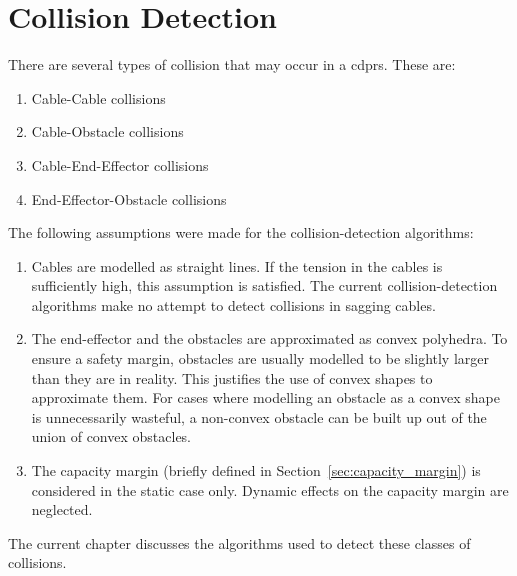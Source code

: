 \chapter{Collision Detection}%
\label{chap:collision_detection}


	There are several types of collision that may occur in a \glspl{cdpr}. These
	are:

	\begin{enumerate}

		\item Cable-Cable collisions

		\item Cable-Obstacle collisions

		\item Cable-End-Effector collisions

		\item End-Effector-Obstacle collisions

	\end{enumerate}

	The following assumptions were made for the collision-detection
	algorithms:

	\begin{enumerate}

		\item

			Cables are modelled as straight lines. If the tension in the cables
			is sufficiently high, this assumption is satisfied. The current
			collision-detection algorithms make no attempt to detect collisions
			in sagging cables.

		\item

			The end-effector and the obstacles are approximated as convex
			polyhedra. To ensure a safety margin, obstacles are usually modelled
			to be slightly larger than they are in reality. This justifies the
			use of convex  shapes to approximate them. For cases where modelling
			an obstacle as a convex shape is unnecessarily wasteful, a
			non-convex obstacle can be built up out of the union of convex
			obstacles.

		\item

			The capacity
			margin (briefly defined in Section~\ref{sec:capacity_margin})
			is considered in the static case only. Dynamic effects on the
			capacity margin are neglected.

	\end{enumerate}

	The current chapter discusses the algorithms used to detect these classes of
	collisions.

	
	
	
	
	
	
